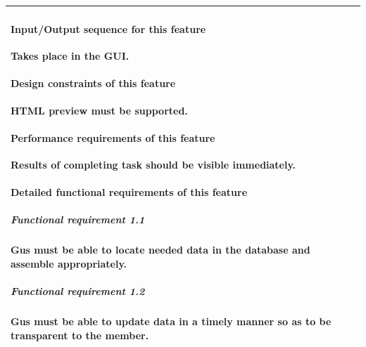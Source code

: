 \documentclass[letterpaper]{article}
\begin{document}
\begin{flushleft}
\begin{supertabular}{|m{3.17056in}|m{3.1712599in}|}
\paragraph[Input/Output sequence for this
feature]{\rmfamily Input/Output sequence for
this feature}
{\color{black} Takes place in the GUI.}

\paragraph[Design constraints of this
feature]{\rmfamily Design constraints of this
feature}
{\color{black} HTML preview must be supported.}

\paragraph[Performance requirements of this
feature]{\rmfamily Performance requirements of
this feature}
{\color{black} Results of completing task should be visible
immediately.}

\paragraph[Detailed functional requirements of this
feature]{\rmfamily Detailed functional
requirements of this feature}
\subparagraph[Functional requirement 1.1]{
Functional requirement 1.1}
{\color{black} Gus must be able to locate needed data in the database
and assemble appropriately.}

\subparagraph[Functional requirement 1.2]{
Functional requirement 1.2}
{\color{black} Gus must be able to update data in a timely manner so as
to be transparent to the member.}

~
\\\hline
\end{supertabular}
\end{flushleft}

\bigskip


\bigskip


\bigskip


\bigskip


\bigskip


\bigskip


\bigskip
\end{document}
